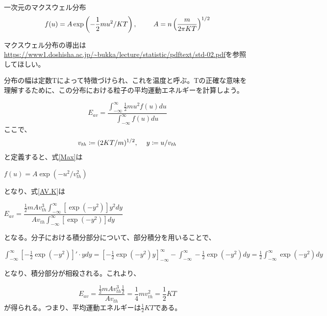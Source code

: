 \documentclass{ltjsarticle}
\numberwithin{equation}{section} %
\begin{document}
\begin{eqbox}{一次元のマクスウェル分布}
\begin{equation}
f(u) = A \exp\left(-\frac{1}{2}mu^2/KT\right),\hspace{2pc} A = n\left(\frac{m}{2\pi KT}\right)^{1/2} \label{Max}
\end{equation}
\end{eqbox}

マクスウェル分布の導出は\url{https://www1.doshisha.ac.jp/~bukka/lecture/statistic/pdftext/std-02.pdf}を参照してほしい。

分布の幅は定数Tによって特徴づけられ、これを温度と呼ぶ。Tの正確な意味を理解するために、この分布における粒子の平均運動エネルギーを計算しよう。

\begin{equation}
 E_{av} = \frac{\int_{-\infty}^{\infty} \frac{1}{2}mu^2 f(u)du}{\int_{-\infty}^{\infty} f(u)du} \label{AV.K}
\end{equation}
ここで、
\begin{equation}
  v_{th} \coloneqq (2KT/m)^{1/2}, \hspace{1pc} y \coloneqq u/v_{th} \label{df.v_th}
\end{equation}
と定義すると、式\eqref{Max}は

\begin{center}
 $f(u) = A \exp(-u^2/v^2_{th})$ 
\end{center}
となり、式\eqref{AV.K}は

\begin{center}
  $E_{av} = \dfrac{\frac{1}{2}mAv^3_{th}\int_{-\infty}^{\infty}[\exp(-y^2)]y^2dy}{Av_{th}\int_{-\infty}^{\infty}[\exp(-y^2)]dy}$
\end{center}
となる。分子における積分部分について、部分積分を用いることで、

\begin{center}
  $\int_{-\infty}^{\infty} [-\frac{1}{2}\exp(-y^2)]'\cdot ydy = \left[-\frac{1}{2}\exp(-y^2)y\right]_{-\infty}^{\infty} - \int_{-\infty}^{\infty} -\frac{1}{2}\exp(-y^2)dy
  = \frac{1}{2}\int_{-\infty}^{\infty}\exp(-y^2)dy $
\end{center}
となり、積分部分が相殺される。これより、

\begin{equation}
  E_{av} = \frac{\frac{1}{2}mAv_{th}^3\frac{1}{2}}{Av_{th}} = \frac{1}{4}mv_{th}^2 = \frac{1}{2}KT \label{av.kenetic}
\end{equation}
が得られる。つまり、平均運動エネルギーは$\frac{1}{2}KT$である。
\end{document}
